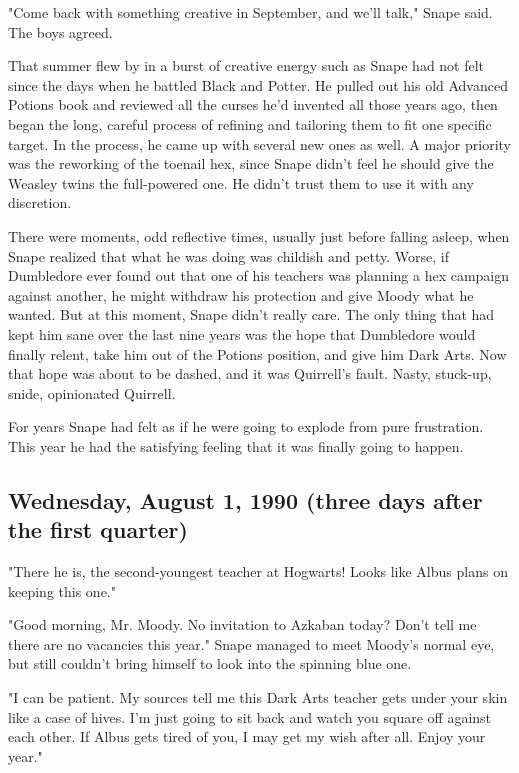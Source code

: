 "Come back with something creative in September, and we'll talk," Snape said. The boys agreed.

That summer flew by in a burst of creative energy such as Snape had not felt since the days when he battled Black and Potter. He pulled out his old Advanced Potions book and reviewed all the curses he'd invented all those years ago, then began the long, careful process of refining and tailoring them to fit one specific target. In the process, he came up with several new ones as well. A major priority was the reworking of the toenail hex, since Snape didn't feel he should give the Weasley twins the full-powered one. He didn't trust them to use it with any discretion.

There were moments, odd reflective times, usually just before falling asleep, when Snape realized that what he was doing was childish and petty. Worse, if Dumbledore ever found out that one of his teachers was planning a hex campaign against another, he might withdraw his protection and give Moody what he wanted. But at this moment, Snape didn't really care. The only thing that had kept him sane over the last nine years was the hope that Dumbledore would finally relent, take him out of the Potions position, and give him Dark Arts. Now that hope was about to be dashed, and it was Quirrell's fault. Nasty, stuck-up, snide, opinionated Quirrell.

For years Snape had felt as if he were going to explode from pure frustration. This year he had the satisfying feeling that it was finally going to happen.

\subsection{Wednesday, August 1, 1990 (three days after the first quarter)}

"There he is, the second-youngest teacher at Hogwarts! Looks like Albus plans on keeping this one."

"Good morning, Mr. Moody. No invitation to Azkaban today? Don't tell me there are no vacancies this year." Snape managed to meet Moody's normal eye, but still couldn't bring himself to look into the spinning blue one.

"I can be patient. My sources tell me this Dark Arts teacher gets under your skin like a case of hives. I'm just going to sit back and watch you square off against each other. If Albus gets tired of you, I may get my wish after all. Enjoy your year."

